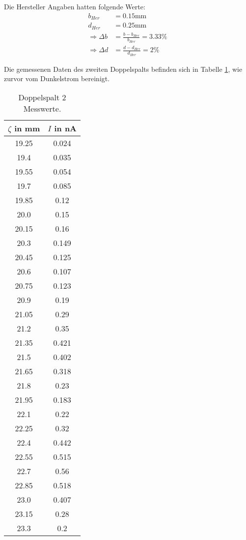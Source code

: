 Die Hersteller Angaben hatten folgende Werte:
\begin{align*}
  b_{Her} &= 0.15 \text{mm} \\
  d_{Her} &= 0.25 \text{mm} \\
  \Rightarrow \Delta b &= \frac{b - b_{Her}}{b_{Her}} = 3.33\% \\
  \Rightarrow \Delta d &= \frac{d - d_{Her}}{d_{Her}} = 2\%
\end{align*}

Die gemessenen Daten des zweiten Doppelspalts befinden sich in Tabelle \ref{tab:doppel2}, wie zurvor vom Dunkelstrom bereinigt.

\begin{table}
  \centering
  \caption{Doppelspalt 2 Messwerte.}
  \label{tab:doppel2}
\begin{tabular}{c c}
  \toprule
  $\zeta$ in mm & $I$ in nA \\
  \midrule
  19.25  &  0.024 \\
  19.4  &  0.035 \\
  19.55  &  0.054 \\
  19.7  &  0.085 \\
  19.85  &  0.12 \\
  20.0  &  0.15 \\
  20.15  &  0.16 \\
  20.3  &  0.149 \\
  20.45  &  0.125 \\
  20.6  &  0.107 \\
  20.75  &  0.123 \\
  20.9  &  0.19 \\
  21.05  &  0.29 \\
  21.2  &  0.35 \\
  21.35  &  0.421 \\
  21.5  &  0.402 \\
  21.65  &  0.318 \\
  21.8  &  0.23 \\
  21.95  &  0.183 \\
  22.1  &  0.22 \\
  22.25  &  0.32 \\
  22.4  &  0.442 \\
  22.55  &  0.515 \\
  22.7  &  0.56 \\
  22.85  &  0.518 \\
  23.0  &  0.407 \\
  23.15  &  0.28 \\
  23.3  &  0.2 \\

\end{tabular}
\end{table}
